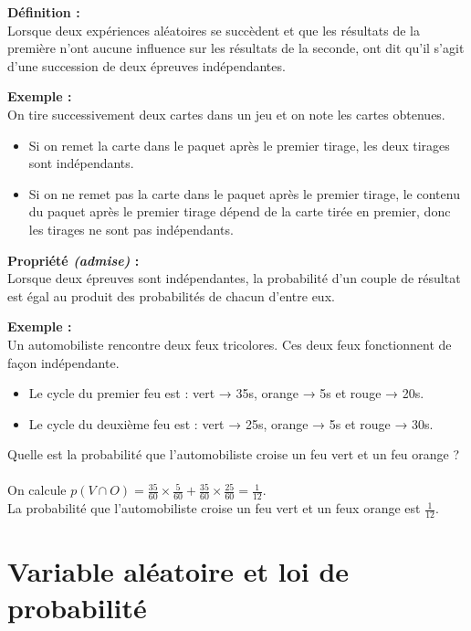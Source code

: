 \documentclass{article}
\begin{document}
\begin{mdframed}[style=definitionStyle]
	\textbf{Définition :} ~\\
	Lorsque deux expériences aléatoires se succèdent et que les résultats de la première n'ont aucune influence sur les résultats de la seconde, ont dit qu'il s'agit d'une succession de deux épreuves indépendantes.
\end{mdframed}

\textbf{Exemple :} ~\\
On tire successivement deux cartes dans un jeu et on note les cartes obtenues.
\begin{itemize}
	\item Si on remet la carte dans le paquet après le premier tirage, les deux tirages sont indépendants.
	\item Si on ne remet pas la carte dans le paquet après le premier tirage, le contenu du paquet après le premier tirage dépend de la carte tirée en premier, donc les tirages ne sont pas indépendants.
\end{itemize}


\begin{mdframed}[style=proprieteStyle]
	\textbf{Propriété \emph{(admise)} :} ~\\
	Lorsque deux épreuves sont indépendantes, la probabilité d'un couple de résultat est égal au produit des probabilités de chacun d'entre eux.
\end{mdframed}

\textbf{Exemple :} ~\\
Un automobiliste rencontre deux feux tricolores. Ces deux feux fonctionnent de façon indépendante.
\begin{itemize}
	\item Le cycle du premier feu est : vert → 35s, orange → 5s et rouge → 20s.
	\item Le cycle du deuxième feu est : vert → 25s, orange → 5s et rouge → 30s.
\end{itemize}
Quelle est la probabilité que l'automobiliste croise un feu vert et un feu orange ? ~\\

On calcule $p(V\cap O)=\frac{35}{60}\times\frac{5}{60}+\frac{35}{60}\times\frac{25}{60}=\frac{1}{12}$.\\
La probabilité que l'automobiliste croise un feu vert et un feux orange est $\frac{1}{12}$.

\section{Variable aléatoire et loi de probabilité}
\end{document}
